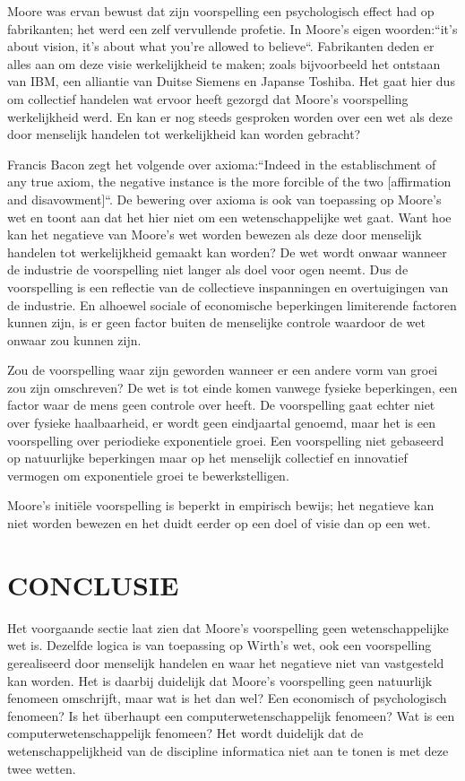 \documentclass[a4paper,11pt]{article}
\begin{document}
Moore was ervan bewust dat zijn voorspelling een psychologisch effect had op fabrikanten; het werd een zelf
vervullende profetie\cite[p~55]{schallerMooreLawPresent1997}. In Moore’s eigen woorden:``it’s about vision, it’s about
what you’re allowed to
believe``\cite[p~59]{schallerMooreLawPresent1997}. Fabrikanten deden er alles aan om deze visie werkelijkheid te
maken;
zoals bijvoorbeeld het
ontstaan van IBM, een alliantie van Duitse Siemens en Japanse Toshiba. Het gaat hier dus om collectief handelen wat
ervoor heeft gezorgd dat Moore’s voorspelling werkelijkheid werd. En kan er nog steeds gesproken worden over een
wet
als deze door menselijk handelen tot werkelijkheid kan worden gebracht?

Francis Bacon zegt het volgende over axioma:``Indeed in the establischment of any true axiom, the negative instance
is
the more forcible of the two [affirmation and disavowment]``\cite[p.~20]{baconBaconNewOrganon}. De bewering over
axioma is ook van
toepassing
op Moore’s wet en toont aan dat het hier niet om een wetenschappelijke wet gaat. Want hoe kan het negatieve van
Moore’s wet worden bewezen als deze door menselijk handelen tot werkelijkheid gemaakt kan worden? De wet wordt
onwaar
wanneer de industrie de voorspelling niet langer als doel voor ogen neemt. Dus de voorspelling is een reflectie van
de
collectieve inspanningen en overtuigingen van de industrie. En alhoewel sociale of economische beperkingen
limiterende factoren kunnen zijn, is er geen factor buiten de menselijke controle waardoor de wet onwaar zou kunnen
zijn.

Zou de voorspelling waar zijn geworden wanneer er een andere vorm van groei zou zijn omschreven? De wet is tot
einde
komen vanwege fysieke beperkingen, een factor waar de mens geen controle over heeft. De voorspelling gaat echter
niet
over fysieke haalbaarheid, er wordt geen eindjaartal genoemd, maar het is een voorspelling over periodieke
exponentiele
groei. Een voorspelling niet gebaseerd op natuurlijke beperkingen maar op het menselijk collectief en innovatief
vermogen om exponentiele groei te bewerkstelligen.

Moore’s initiële voorspelling is beperkt in empirisch bewijs; het negatieve kan niet worden bewezen en het duidt
eerder
op een doel of visie dan op een wet.
\section*{CONCLUSIE}
Het voorgaande sectie laat zien dat Moore’s voorspelling geen wetenschappelijke wet is. Dezelfde logica is van
toepassing op Wirth’s wet, ook een voorspelling gerealiseerd door menselijk handelen en waar het negatieve niet
van
vastgesteld kan worden\cite{wirthPleaLeanSoftware1995}. Het is daarbij duidelijk dat Moore’s voorspelling geen
natuurlijk fenomeen omschrijft,
maar
wat is het dan wel? Een economisch of psychologisch fenomeen? Is het überhaupt een computerwetenschappelijk fenomeen?
Wat is
een
computerwetenschappelijk fenomeen? Het wordt duidelijk dat de wetenschappelijkheid van de discipline informatica niet
aan te
tonen is
met deze twee wetten.
\end{document}
